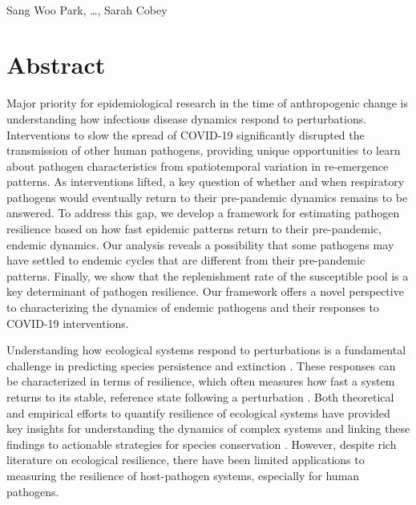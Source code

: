 \documentclass[12pt]{article}
\date{\today}
\begin{document}
\begin{flushleft}{
	\Large
	\textbf{}
}
\newline
\\
Sang Woo Park, \dots, Sarah Cobey
\\
\bigskip
\end{flushleft}

\section*{Abstract}

Major priority for epidemiological research in the time of anthropogenic change is understanding how infectious disease dynamics respond to perturbations.
Interventions to slow the spread of COVID-19 significantly disrupted the transmission of other human pathogens, providing unique opportunities to learn about pathogen characteristics from spatiotemporal variation in re-emergence patterns. 
As interventions lifted, a key question of whether and when respiratory pathogens would eventually return to their pre-pandemic dynamics remains to be answered. 
To address this gap, we develop a framework for estimating pathogen resilience based on how fast epidemic patterns return to their pre-pandemic, endemic dynamics.
Our analysis reveals a possibility that some pathogens may have settled to endemic cycles that are different from their pre-pandemic patterns.
Finally, we show that the replenishment rate of the susceptible pool is a key determinant of pathogen resilience.
Our framework offers a novel perspective to characterizing the dynamics of endemic pathogens and their responses to COVID-19 interventions.

\pagebreak

Understanding how ecological systems respond to perturbations is a fundamental challenge in predicting species persistence and extinction \citep{bender1984perturbation,ives2007stability,scheffer2009early}.
These responses can be characterized in terms of resilience, which often measures how fast a system returns to its stable, reference state following a perturbation \citep{pimm1979structure, neubert1997alternatives,gunderson2000ecological,dakos2022ecological}.
Both theoretical and empirical efforts to quantify resilience of ecological systems have provided key insights for understanding the dynamics of complex systems and linking these findings to actionable strategies for species conservation \citep{chambers2019operationalizing}.
However, despite rich literature on ecological resilience, there have been limited applications to measuring the resilience of host-pathogen systems, especially for human pathogens.
\end{document}
